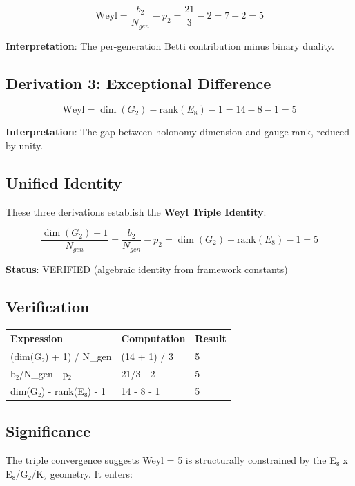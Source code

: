 \documentclass[11pt,a4paper]{article}
\begin{document}
\[\text{Weyl} = \frac{b_2}{N_{gen}} - p_2 = \frac{21}{3} - 2 = 7 - 2 = 5\]

\textbf{Interpretation}: The per-generation Betti contribution minus binary duality.

\subsection{Derivation 3: Exceptional Difference}\label{derivation-3-exceptional-difference}

\[\text{Weyl} = \dim(G_2) - \text{rank}(E_8) - 1 = 14 - 8 - 1 = 5\]

\textbf{Interpretation}: The gap between holonomy dimension and gauge rank, reduced by unity.

\subsection{Unified Identity}\label{unified-identity}

These three derivations establish the \textbf{Weyl Triple Identity}:

\[\boxed{\frac{\dim(G_2) + 1}{N_{gen}} = \frac{b_2}{N_{gen}} - p_2 = \dim(G_2) - \text{rank}(E_8) - 1 = 5}\]

\textbf{Status}: VERIFIED (algebraic identity from framework constants)

\subsection{Verification}\label{verification}

\begin{longtable}[]{@{}lll@{}}
\toprule\noalign{}
Expression & Computation & Result \\
\midrule\noalign{}
\endhead
\bottomrule\noalign{}
\endlastfoot
(dim(G₂) + 1) / N\_\allowbreak{}gen & (14 + 1) / 3 & 5 \\
b₂/N\_\allowbreak{}gen - p₂ & 21/3 - 2 & 5 \\
dim(G₂) - rank(E₈) - 1 & 14 - 8 - 1 & 5 \\
\end{longtable}

\subsection{Significance}\label{significance}

The triple convergence suggests Weyl = 5 is structurally constrained by the E₈ x E₈/G₂/K₇ geometry. It enters:
\end{document}
